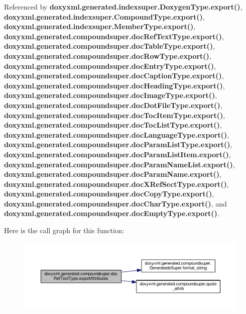 Referenced by {\bf doxyxml.\+generated.\+indexsuper.\+Doxygen\+Type.\+export()}, {\bf doxyxml.\+generated.\+indexsuper.\+Compound\+Type.\+export()}, {\bf doxyxml.\+generated.\+indexsuper.\+Member\+Type.\+export()}, {\bf doxyxml.\+generated.\+compoundsuper.\+doc\+Ref\+Text\+Type.\+export()}, {\bf doxyxml.\+generated.\+compoundsuper.\+doc\+Table\+Type.\+export()}, {\bf doxyxml.\+generated.\+compoundsuper.\+doc\+Row\+Type.\+export()}, {\bf doxyxml.\+generated.\+compoundsuper.\+doc\+Entry\+Type.\+export()}, {\bf doxyxml.\+generated.\+compoundsuper.\+doc\+Caption\+Type.\+export()}, {\bf doxyxml.\+generated.\+compoundsuper.\+doc\+Heading\+Type.\+export()}, {\bf doxyxml.\+generated.\+compoundsuper.\+doc\+Image\+Type.\+export()}, {\bf doxyxml.\+generated.\+compoundsuper.\+doc\+Dot\+File\+Type.\+export()}, {\bf doxyxml.\+generated.\+compoundsuper.\+doc\+Toc\+Item\+Type.\+export()}, {\bf doxyxml.\+generated.\+compoundsuper.\+doc\+Toc\+List\+Type.\+export()}, {\bf doxyxml.\+generated.\+compoundsuper.\+doc\+Language\+Type.\+export()}, {\bf doxyxml.\+generated.\+compoundsuper.\+doc\+Param\+List\+Type.\+export()}, {\bf doxyxml.\+generated.\+compoundsuper.\+doc\+Param\+List\+Item.\+export()}, {\bf doxyxml.\+generated.\+compoundsuper.\+doc\+Param\+Name\+List.\+export()}, {\bf doxyxml.\+generated.\+compoundsuper.\+doc\+Param\+Name.\+export()}, {\bf doxyxml.\+generated.\+compoundsuper.\+doc\+X\+Ref\+Sect\+Type.\+export()}, {\bf doxyxml.\+generated.\+compoundsuper.\+doc\+Copy\+Type.\+export()}, {\bf doxyxml.\+generated.\+compoundsuper.\+doc\+Char\+Type.\+export()}, and {\bf doxyxml.\+generated.\+compoundsuper.\+doc\+Empty\+Type.\+export()}.



Here is the call graph for this function\+:
\nopagebreak
\begin{figure}[H]
\begin{center}
\leavevmode
\includegraphics[width=350pt]{d6/d3c/classdoxyxml_1_1generated_1_1compoundsuper_1_1docRefTextType_ada2988f4f65675828822dd175119d17f_cgraph}
\end{center}
\end{figure}




